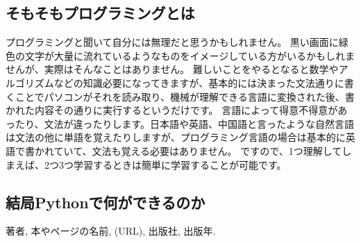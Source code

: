 \documentclass[10pt,b5paper,papersize,dvipdfmx]{jsbook}
\begin{document}
\subsection{そもそもプログラミングとは}
プログラミングと聞いて自分には無理だと思うかもしれません。
黒い画面に緑色の文字が大量に流れているようなものをイメージしている方がいるかもしれませんが、実際はそんなことはありません。
難しいことをやるとなると数学やアルゴリズムなどの知識必要になってきますが、基本的には決まった文法通りに書くことでパソコンがそれを読み取り、機械が理解できる言語に変換された後、書かれた内容その通りに実行するというだけです。
言語によって得意不得意があったり、文法が違ったりします。日本語や英語、中国語と言ったような自然言語は文法の他に単語を覚えたりしますが、プログラミング言語の場合は基本的に英語で書かれていて、文法も覚える必要はありません。
ですので、1つ理解してしまえば、2つ3つ学習するときは簡単に学習することが可能です。\par
\subsection{結局Pythonで何ができるのか}

\begin{thebibliography}{99}
  \item 著者, 本やページの名前, (URL), 出版社, 出版年.
\end{thebibliography}
\end{document}
